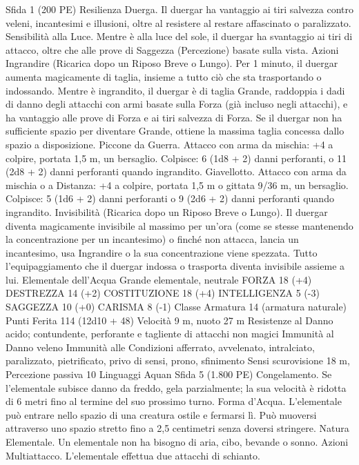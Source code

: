 \begin{multicols}{2}
Sfida 1 (200 PE)
Resilienza Duerga. Il duergar ha vantaggio ai tiri salvezza contro
veleni, incantesimi e illusioni, oltre al resistere al restare
affascinato o paralizzato.
Sensibilità alla Luce. Mentre è alla luce del sole, il duergar ha
svantaggio ai tiri di attacco, oltre che alle prove di Saggezza
(Percezione) basate sulla vista.
Azioni
Ingrandire (Ricarica dopo un Riposo Breve o Lungo). Per 1
minuto, il duergar aumenta magicamente di taglia, insieme a
tutto ciò che sta trasportando o indossando. Mentre è ingrandito,
il duergar è di taglia Grande, raddoppia i dadi di danno degli
attacchi con armi basate sulla Forza (già incluso negli attacchi), e
ha vantaggio alle prove di Forza e ai tiri salvezza di Forza. Se il
duergar non ha sufficiente spazio per diventare Grande, ottiene la
massima taglia concessa dallo spazio a disposizione.
Piccone da Guerra. Attacco con arma da mischia: +4 a colpire,
portata 1,5 m, un bersaglio.
Colpisce: 6 (1d8 + 2) danni perforanti, o 11 (2d8 + 2) danni
perforanti quando ingrandito.
Giavellotto. Attacco con arma da mischia o a Distanza: +4 a
colpire, portata 1,5 m o gittata 9/36 m, un bersaglio.
Colpisce: 5 (1d6 + 2) danni perforanti o 9 (2d6 + 2) danni
perforanti quando ingrandito.
Invisibilità (Ricarica dopo un Riposo Breve o Lungo). Il
duergar diventa magicamente invisibile al massimo per un’ora
(come se stesse mantenendo la concentrazione per un
incantesimo) o finché non attacca, lancia un incantesimo, usa
Ingrandire o la sua concentrazione viene spezzata. Tutto
l’equipaggiamento che il duergar indossa o trasporta diventa
invisibile assieme a lui.
Elementale dell’Acqua
Grande elementale, neutrale
FORZA 18 (+4)
DESTREZZA 14 (+2)
COSTITUZIONE 18 (+4)
INTELLIGENZA 5 (-3)
SAGGEZZA 10 (+0)
CARISMA 8 (-1)
Classe Armatura 14 (armatura naturale)
Punti Ferita 114 (12d10 + 48)
Velocità 9 m, nuoto 27 m
Resistenze al Danno acido; contundente, perforante e tagliente
di attacchi non magici
Immunità al Danno veleno
Immunità alle Condizioni afferrato, avvelenato, intralciato,
paralizzato, pietrificato, privo di sensi, prono, sfinimento
Sensi scurovisione 18 m, Percezione passiva 10
Linguaggi Aquan
Sfida 5 (1.800 PE)
Congelamento. Se l’elementale subisce danno da freddo, gela
parzialmente; la sua velocità è ridotta di 6 metri fino al termine
del suo prossimo turno.
Forma d’Acqua. L’elementale può entrare nello spazio di una
creatura ostile e fermarsi lì. Può muoversi attraverso uno spazio
stretto fino a 2,5 centimetri senza doversi stringere.
Natura Elementale. Un elementale non ha bisogno di aria, cibo,
bevande o sonno.
Azioni
Multiattacco. L’elementale effettua due attacchi di schianto.

\end{multicols}
